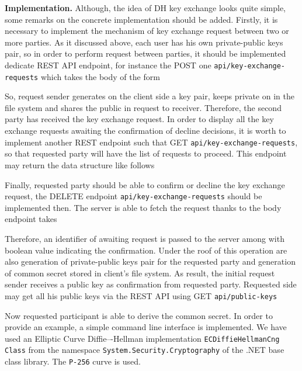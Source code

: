\textbf{Implementation.} Although, the idea of DH key exchange looks quite simple, some remarks on the concrete
implementation should be added.
Firstly, it is necessary to implement the mechanism of key exchange request between two or more parties.
As it discussed above, each user has his own private-public keys pair, so in order to perform request between parties,
it should be implemented dedicate REST API endpoint, for instance the POST one \texttt{api/key-exchange-requests} which
takes the body of the form



So, request sender generates on the client side a key pair, keeps private on in the file system and shares the public
in request to receiver.
Therefore, the second party has received the key exchange request.
In order to display all the key exchange requests awaiting the confirmation of decline decisions, it is worth to implement
another REST endpoint such that GET \texttt{api/key-exchange-requests}, so that requested party will have the list of
requests to proceed.
This endpoint may return the data structure like follows



Finally, requested party should be able to confirm or decline the key exchange request, the DELETE endpoint
\texttt{api/key-exchange-requests} should be implemented then.
The server is able to fetch the request thanks to the body endpoint takes



Therefore, an identifier of awaiting request is passed to the server among with boolean value
indicating the confirmation.
Under the roof of this operation are also generation of private-public keys pair for the requested party and
generation of common secret stored in client's file system.
As result, the initial request sender receives a public key as confirmation from requested party.
Requested side may get all his public keys via the REST API using GET \texttt{api/public-keys}



Now requested participant is able to derive the common secret.
In order to provide an example, a simple command line interface is implemented.
We have used an Elliptic Curve Diffie–-Hellman implementation \texttt{ECDiffieHellmanCng Class} from the namespace
\texttt{System.Security.Cryptography} of the .NET base class library.
The \texttt{P-256} curve is used.

